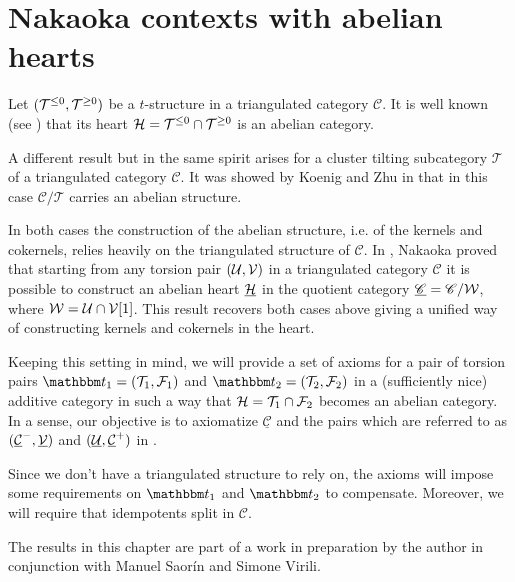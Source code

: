 \chapter{Nakaoka contexts with abelian hearts}\label{ch:nakaoka} %

Let $(\mathcal{T}^{\leq 0},\mathcal{T}^{\geq 0})$ be a $t$-structure in a triangulated category $\mathscr{C}$. It is well known (see \cite{bbd82}) that its heart $\mathcal{H}=\mathcal{T}^{\leq 0}\cap\mathcal{T}^{\geq 0}$ is an abelian category.

A different result but in the same spirit arises for a cluster tilting subcategory $\mathscr{T}$ of a triangulated category $\mathscr{C}$. It was showed by Koenig and Zhu in \cite{Koenig2008} that in this case $\mathscr{C}/\mathscr{T}$ carries an abelian structure.

In both cases the construction of the abelian structure, i.e. of the kernels and cokernels, relies heavily on the triangulated structure of $\mathscr{C}$. In \cite{Nakaokaa}, Nakaoka proved that starting from any torsion pair $(\mathcal{U},\mathcal{V})$ in a triangulated category $\mathscr{C}$ it is possible to construct an abelian heart $\underline{\mathcal{H}}$ in the quotient category $\underline{\mathscr{C}}=\mathscr{C}/\mathcal{W}$, where $\mathcal{W}=\mathcal{U}\cap\mathcal{V}[1]$. 
This result recovers both cases above giving a unified way of constructing kernels and cokernels in the heart.

Keeping this setting in mind, we will provide a set of axioms for a pair of torsion pairs $\t_1=(\T_1,\F_1)$ and $\t_2=(\T_2,\F_2)$ in a (sufficiently nice) 
additive category in such a way that $\mathcal{H} = \mathcal{T}_1\cap\mathcal{F}_2$ becomes an abelian category. In a sense, our objective is to axiomatize $\underline{\mathscr{C}}$ and the pairs which are referred to as $(\underline{\mathcal{C}}^-,\underline{\mathcal{V}})$ and $(\underline{\mathcal{U}},\underline{\mathcal{C}}^+)$ in \cite{Nakaokaa}.

Since we don't have a triangulated structure to rely on, the axioms will impose some requirements on $\t_1$ and $\t_2$ to compensate. Moreover, we will require that idempotents split in $\mathscr{C}$.

The results in this chapter are part of a work in preparation by the author in conjunction with Manuel Saor\'in and Simone Virili.

